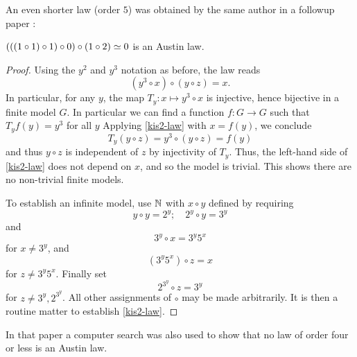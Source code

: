 An even shorter law (order $5$) was obtained by the same author in a followup paper \cite{Kisielewicz2}:

\begin{theorem}\label{kis-thm2}
$(((1 \circ 1) \circ 1) \circ 0) \circ (1 \circ 2) \simeq 0$ is an Austin law.
\end{theorem}

\begin{proof} Using the $y^2$ and $y^3$ notation as before, the law reads
\begin{equation}\label{kis2-law}
   (y^3 \circ x) \circ (y \circ z) = x.
  \end{equation}
In particular, for any $y$, the map $T_y \colon x \mapsto y^3 \circ x$ is injective, hence bijective in a finite model $G$.  In particular we can find a function $f : G \to G$ such that $T_y f(y) = y^3$ for all $y$  Applying \eqref{kis2-law} with $x = f(y)$, we conclude
$$ T_y(y \circ z) = y^3 \circ (y \circ z) = f(y) $$
and thus $y \circ z$ is independent of $z$ by injectivity of $T_y$.  Thus, the left-hand side of \eqref{kis2-law} does not depend on $x$, and so the model is trivial.  This shows there are no non-trivial finite models.

To establish an infinite model, use $\mathbb{N}$ with $x \circ y$ defined by requiring
$$ y \circ y = 2^y; \quad 2^y \circ y = 3^y$$
and
$$ 3^y \circ x = 3^y 5^x$$
for $x \neq 3^y$, and
$$ (3^y 5^x) \circ z = x$$
for $z \neq 3^y 5^x$.  Finally set
$$ 2^{3^y} \circ z = 3^y$$
for $z \neq 3^y, 2^{3^y}$.  All other assignments of $\circ$ may be made arbitrarily. It is then a routine matter to establish \eqref{kis2-law}.
\end{proof}

In that paper a computer search was also used to show that no law of order four or less is an Austin law.

